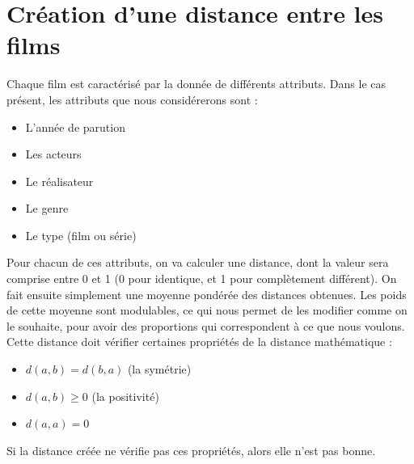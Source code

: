 \documentclass{report}
\begin{document}
\section{Création d'une distance entre les films}
Chaque film est caractérisé par la donnée de différents attributs. Dans le cas présent, les attributs que nous considérerons sont :
\begin{itemize}
    \item L'année de parution
    \item Les acteurs
    \item Le réalisateur
    \item Le genre
    \item Le type (film ou série)
\end{itemize}
Pour chacun de ces attributs, on va calculer une distance, dont la valeur sera comprise entre 0 et 1 (0 pour identique, et 1 pour complètement différent). On fait ensuite simplement une moyenne pondérée des distances obtenues. Les poids de cette moyenne sont modulables, ce qui nous permet de les modifier comme on le souhaite, pour avoir des proportions qui correspondent à ce que nous voulons.\\
Cette distance doit vérifier certaines propriétés de la distance mathématique :
\begin{itemize}
    \item \(d(a,b)=d(b,a)\) (la symétrie)
    \item \(d(a,b) \geq 0\) (la positivité)
    \item \(d(a,a)=0\)
\end{itemize}
Si la distance créée ne vérifie pas ces propriétés, alors elle n'est pas bonne.
\end{document}
